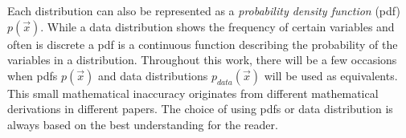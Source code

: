 Each distribution can also be represented as a \textit{probability density function} (pdf) $p(\vec{x})$. While a data distribution shows the frequency of certain variables and often is discrete a pdf is a continuous function describing the probability of the variables in a distribution. Throughout this work, there will be a few occasions when pdfs $p(\vec{x})$ and data distributions $p_{data}(\vec{x})$ will be used as equivalents. This small mathematical inaccuracy originates from different mathematical derivations in different papers. The choice of using pdfs or data distribution is always based on the best understanding for the reader.
